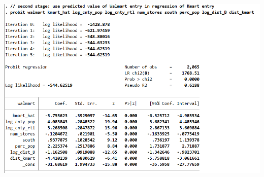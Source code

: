 \documentclass[11pt]{article} %
\begin{document}
\begin{center}
\includegraphics{fig10}

\end{center}
\end{document}
